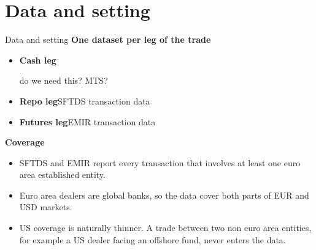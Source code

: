 \documentclass[aspectratio=169,11pt]{beamer}
\newcommand{\todohl}[1]{\colorbox{yellow!45}{\strut #1}}
\begin{document}
\section{Data and setting}
\begin{frame}{Data and setting}
  \textbf{One dataset per leg of the trade}
  \begin{itemize}
    \item \textbf{Cash leg}\quad \todohl{do we need this? MTS?}
    \item \textbf{Repo leg}\quad SFTDS transaction data
    \item \textbf{Futures leg}\quad EMIR transaction data
  \end{itemize}
  \bigskip
  \textbf{Coverage}
  \begin{itemize}
    \item SFTDS and EMIR report every transaction that involves at least one euro area established entity.
    \item Euro area dealers are global banks, so the data cover both parts of EUR and USD markets.
    \item US coverage is naturally thinner. A trade between two non euro area entities, for example a US dealer facing an offshore fund, never enters the data.
  \end{itemize}
\end{frame}

\end{document}
